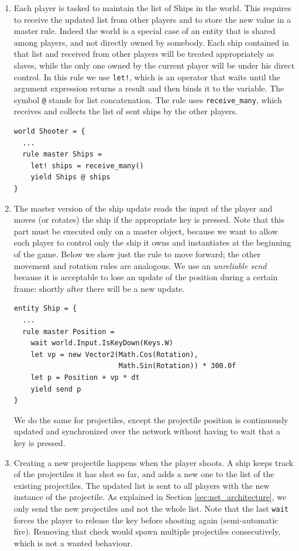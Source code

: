 \begin{enumerate}
	\item Each player is tasked to maintain the list of Ships in the world. This requires to receive the updated list from other players and to store the new value in a master rule. Indeed the world is a special case of an entity that is shared among players, and not directly owned by somebody. Each ship contained in that list and received from other players will be treated appropriately as slaves, while the only one owned by the current player will be under his direct control. In this rule we use \texttt{let!}, which is an operator that waits until the argument expression returns a result and then binds it to the variable. The symbol \texttt{@} stands for list concatenation. The rule uses \texttt{receive\_many}, which receives and collects the list of sent ships by the other players.
	
	\begin{lstlisting}
world Shooter = {
  ...
  rule master Ships =
    let! ships = receive_many()
    yield Ships @ ships
}
	\end{lstlisting}
	
	\item The master version of the ship update reads the input of the player and moves (or rotates) the ship if the appropriate key is pressed. Note that this part must be executed only on a master object, because we want to allow each player to control only the ship it owns and instantiates at the beginning of the game. Below we show just the rule to move forward; the other movement and rotation rules are analogous. We use an \textit{unreliable send} because it is acceptable to lose an update of the position during a certain frame: shortly after there will be a new update.
	
	\begin{lstlisting}
entity Ship = {
  ...
  rule master Position =
    wait world.Input.IsKeyDown(Keys.W)
    let vp = new Vector2(Math.Cos(Rotation), 
                         Math.Sin(Rotation)) * 300.0f
    let p = Position + vp * dt
    yield send p
}
	\end{lstlisting}
	
	We do the same for projectiles, except the projectile position is continuously updated and synchronized over the network without having to wait that a key is pressed.
	
	\item Creating a new projectile happens when the player shoots. A ship keeps track of the projectiles it has shot so far, and adds a new one to the list of the existing projectiles. The updated list is sent to all players with the new instance of the projectile. As explained in Section \ref{sec:net_architecture}, we only send the new projectiles and not the whole list. Note that the last \texttt{wait} forces the player to release the key before shooting again (semi-automatic fire). Removing that check would spawn multiple projectiles consecutively, which is not a wanted behaviour.
	

\end{enumerate}

